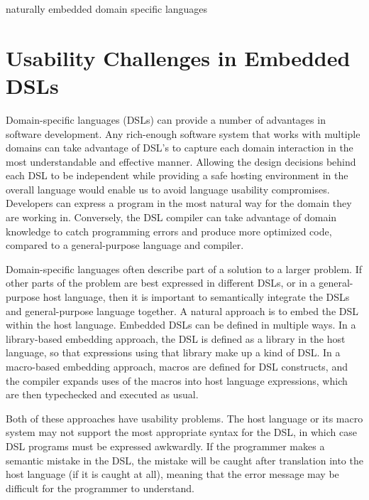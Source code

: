 \documentclass[preprint]{sigplanconf}
\begin{document}

%

\keywords
naturally embedded domain specific languages

\section{Usability Challenges in Embedded DSLs}

Domain-specific languages (DSLs) can provide a number of advantages in
software development. Any rich-enough software system that works with multiple domains can take advantage of DSL's to capture each domain interaction in the most understandable and effective manner. Allowing the design decisions behind each DSL to be independent while providing a safe hosting environment in the overall language would enable us to avoid language usability compromises. Developers can express a program in the most
natural way for the domain they are working in.  Conversely, the DSL
compiler can take advantage of domain knowledge to catch programming
errors and produce more optimized code, compared to a general-purpose
language and compiler.

Domain-specific languages often describe part of a solution to a
larger problem.  If other parts of the problem are best expressed in
different DSLs, or in a general-purpose host language, then it is
important to semantically integrate the DSLs and general-purpose
language together.  A natural approach is to embed the DSL within the
host language.  Embedded DSLs can be defined in multiple ways.  In a
library-based embedding approach, the DSL is defined as a library in
the host language, so that expressions using that library make up a
kind of DSL.  In a macro-based embedding approach, macros are defined
for DSL constructs, and the compiler expands uses of the macros into
host language expressions, which are then typechecked and executed
as usual.

Both of these approaches have usability problems.  The host language
or its macro system may not support the most appropriate syntax for
the DSL, in which case DSL programs must be expressed awkwardly.
If the programmer makes a semantic mistake in the DSL, the mistake
will be caught after translation into the host language (if it is
caught at all), meaning that the error message may be difficult for
the programmer to understand.
\end{document}
